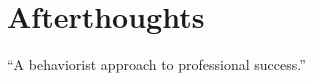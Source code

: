 \documentclass[oneside]{book}
\numberwithin{equation}{section}
\begin{document}
\section{Afterthoughts}

\begin{flushright}
	``A behaviorist approach to professional success.''
\end{flushright}


\begin{thebibliography}{99}
	\bibitem[]{}
\end{thebibliography}


\printbibliography[heading=bibintoc]
	
\end{document}
